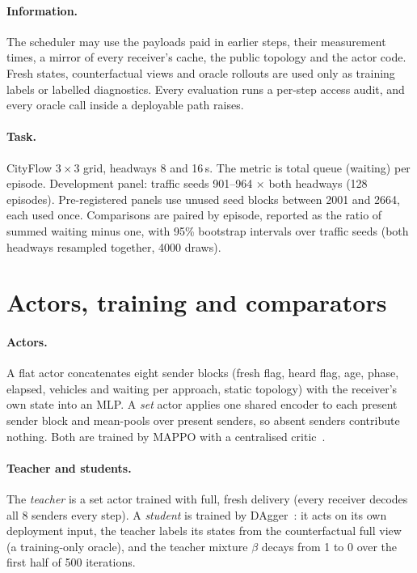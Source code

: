 \documentclass[11pt]{article}
\theoremstyle{definition}
\begin{document}
\paragraph{Information.} The scheduler may use the payloads paid in earlier steps, their measurement times, a mirror of
every receiver's cache, the public topology and the actor code. Fresh states, counterfactual views and oracle rollouts
are used only as training labels or labelled diagnostics. Every evaluation runs a per-step access audit, and every
oracle call inside a deployable path raises.
\paragraph{Task.} CityFlow $3\times3$ grid, headways 8 and 16\,s. The metric is total queue (waiting) per episode.
Development panel: traffic seeds 901--964 $\times$ both headways (128 episodes). Pre-registered panels use unused seed
blocks between 2001 and 2664, each used once. Comparisons are paired by episode, reported as the ratio of summed waiting
minus one, with 95\% bootstrap intervals over traffic seeds (both headways resampled together, 4000 draws).

\section{Actors, training and comparators}\label{sec:methods}
\paragraph{Actors.} A flat actor concatenates eight sender blocks (fresh flag, heard flag, age, phase, elapsed,
vehicles and waiting per approach, static topology) with the receiver's own state into an MLP. A \emph{set} actor applies
one shared encoder to each present sender block and mean-pools over present senders, so absent senders contribute
nothing. Both are trained by MAPPO with a centralised critic~\cite{mappo}.
\paragraph{Teacher and students.} The \emph{teacher} is a set actor trained with full, fresh delivery (every receiver
decodes all 8 senders every step). A \emph{student} is trained by DAgger~\cite{dagger}: it acts on its own deployment
input, the teacher labels its states from the counterfactual full view (a training-only oracle), and the teacher mixture
$\beta$ decays from 1 to 0 over the first half of 500 iterations.
\end{document}
